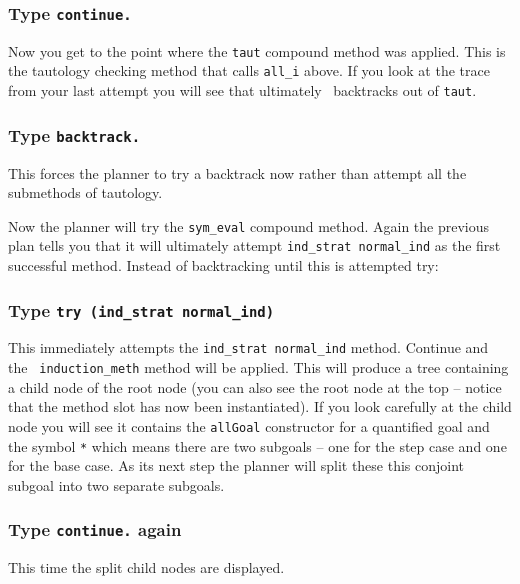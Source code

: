 \subsubsection{Type {\tt continue.}}

Now you get to the point where the {\tt taut} compound
method was
applied.  This is the tautology checking
method that calls {\tt all\_i} above.
If you look at the trace from your last attempt you 
will see that ultimately \lclam\ backtracks out of {\tt taut}.

\subsubsection{Type {\tt backtrack.}}
This forces the planner to try a backtrack now rather than attempt all
the submethods of tautology.

Now the planner will try the {\tt sym\_eval} compound 
method.  Again the previous plan tells you that it will ultimately
attempt {\tt ind\_strat normal\_ind} as the first successful
method.  Instead of backtracking until this is attempted try:

\subsubsection{Type {\tt try (ind\_strat normal\_ind)}}

This immediately attempts the {\tt ind\_strat normal\_ind} method.
Continue and the {\tt
induction\_meth} method will be applied.  This
will produce a tree containing a child node of the root node (you
can also see the root node at the top -- notice that the method slot
has now been instantiated).  If you look carefully at the child node
you will see it contains the {\tt allGoal} constructor for
a quantified goal and the symbol {\tt **}\index{**} which means there
are two subgoals -- one for the step case and one for 
the base case.  As its next step the planner will
split these this conjoint subgoal into two separate subgoals.

\subsubsection{Type {\tt continue.} again}
This time the split child nodes are displayed.

